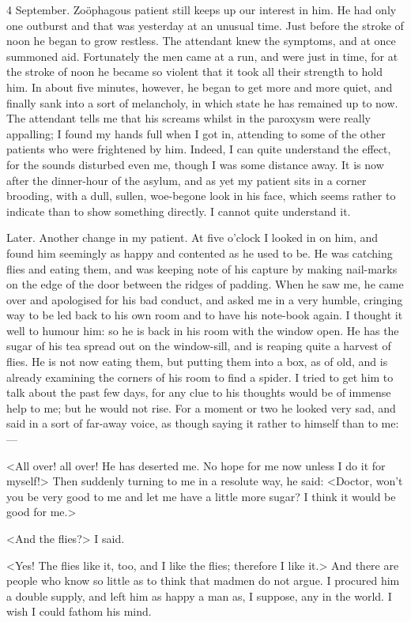 \begin{diary}{4 September.}
Zoöphagous patient still keeps up our interest in him. He had only one outburst and that was yesterday at an unusual time. Just before the stroke of noon he began to grow restless. The attendant knew the symptoms, and at once summoned aid. Fortunately the men came at a run, and were just in time, for at the stroke of noon he became so violent that it took all their strength to hold him. In about five minutes, however, he began to get more and more quiet, and finally sank into a sort of melancholy, in which state he has remained up to now. The attendant tells me that his screams whilst in the paroxysm were really appalling; I found my hands full when I got in, attending to some of the other patients who were frightened by him. Indeed, I can quite understand the effect, for the sounds disturbed even me, though I was some distance away. It is now after the dinner-hour of the asylum, and as yet my patient sits in a corner brooding, with a dull, sullen, woe-begone look in his face, which seems rather to indicate than to show something directly. I cannot quite understand it.
\end{diary}
 
\begin{diary}{Later.}
Another change in my patient. At five o'clock I looked in on him, and found him seemingly as happy and contented as he used to be. He was catching flies and eating them, and was keeping note of his capture by making nail-marks on the edge of the door between the ridges of padding. When he saw me, he came over and apologised for his bad conduct, and asked me in a very humble, cringing way to be led back to his own room and to have his note-book again. I thought it well to humour him: so he is back in his room with the window open. He has the sugar of his tea spread out on the window-sill, and is reaping quite a harvest of flies. He is not now eating them, but putting them into a box, as of old, and is already examining the corners of his room to find a spider. I tried to get him to talk about the past few days, for any clue to his thoughts would be of immense help to me; but he would not rise. For a moment or two he looked very sad, and said in a sort of far-away voice, as though saying it rather to himself than to me:—

<All over! all over! He has deserted me. No hope for me now unless I do it for myself!> Then suddenly turning to me in a resolute way, he said: <Doctor, won't you be very good to me and let me have a little more sugar? I think it would be good for me.>

<And the flies?> I said.

<Yes! The flies like it, too, and I like the flies; therefore I like it.> And there are people who know so little as to think that madmen do not argue. I procured him a double supply, and left him as happy a man as, I suppose, any in the world. I wish I could fathom his mind.
\end{diary}

